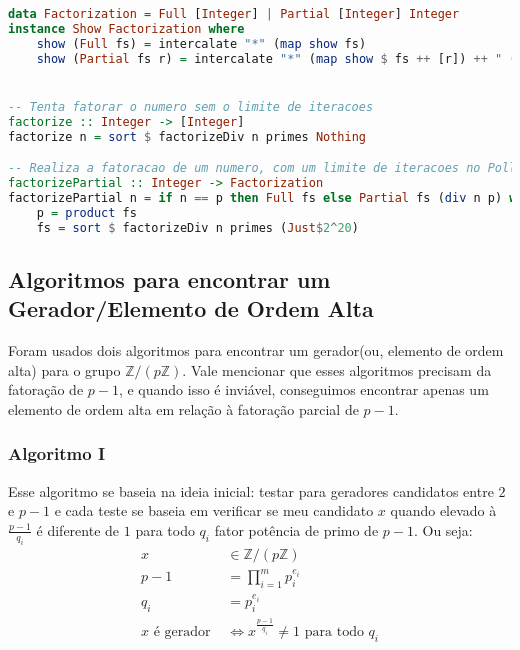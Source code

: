 \documentclass{article}
\begin{document}
\noindent\hspace{0.03\linewidth}
\begin{minipage}{0.9\linewidth}
\begin{lstlisting}[language=haskell,caption=Fatoração]
data Factorization = Full [Integer] | Partial [Integer] Integer
instance Show Factorization where
    show (Full fs) = intercalate "*" (map show fs)
    show (Partial fs r) = intercalate "*" (map show $ fs ++ [r]) ++ " (fatoracao parcial)"


-- Tenta fatorar o numero sem o limite de iteracoes
factorize :: Integer -> [Integer]
factorize n = sort $ factorizeDiv n primes Nothing

-- Realiza a fatoracao de um numero, com um limite de iteracoes no Pollard Rho
factorizePartial :: Integer -> Factorization
factorizePartial n = if n == p then Full fs else Partial fs (div n p) where
    p = product fs
    fs = sort $ factorizeDiv n primes (Just$2^20)
\end{lstlisting}
\end{minipage}

\subsection{Algoritmos para encontrar um Gerador/Elemento de Ordem Alta}
Foram usados dois algoritmos para encontrar um gerador(ou, elemento de ordem alta) para o grupo $\mathbb{Z}/(p\mathbb{Z})$. Vale mencionar que esses algoritmos precisam da fatoração de $p-1$, e quando isso é inviável, conseguimos encontrar apenas um elemento de ordem alta em relação à fatoração parcial de $p-1$.

\subsubsection{Algoritmo I}
Esse algoritmo se baseia na ideia inicial: testar para geradores candidatos entre $2$ e $p-1$ e cada teste se baseia em verificar se meu candidato $x$ quando elevado à $\frac{p-1}{q_i}$ é diferente de $1$ para todo $q_i$ fator potência de primo de $p-1$.
Ou seja:
\begin{align*}
    x &\in \mathbb{Z}/(p\mathbb{Z})\\
    p - 1 &= \prod_{i=1}^{m}p_i^{e_i}\\
    q_i &= p_i^{e_i}\\
    x \text{ é gerador } &\iff x^{\frac{p-1}{q_i}} \neq 1 \text{ para todo } q_i
\end{align*}
\end{document}
